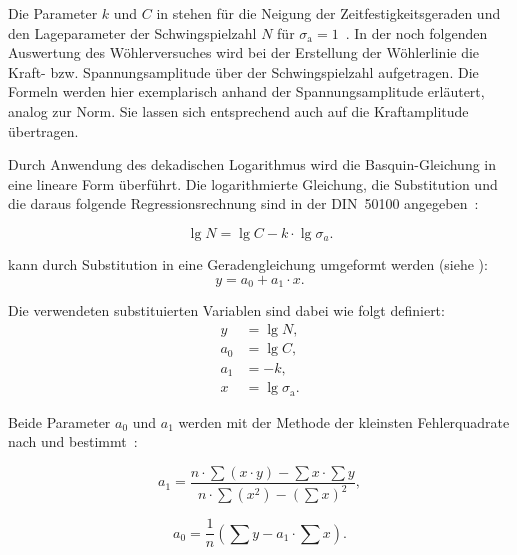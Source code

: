Die Parameter $k$ und $C$ in  stehen für die Neigung der Zeitfestigkeitsgeraden und den Lageparameter der Schwingspielzahl $N$ für $\sigma_{\text{a}} = 1$~\cite[Seite~15]{DIN50100}. 
In der noch folgenden Auswertung des Wöhlerversuches wird bei der Erstellung der Wöhlerlinie die Kraft- bzw. Spannungsamplitude über der Schwingspielzahl aufgetragen. Die Formeln werden hier exemplarisch anhand der Spannungsamplitude erläutert, analog zur Norm. Sie lassen sich entsprechend auch auf die Kraftamplitude übertragen.

Durch Anwendung des dekadischen Logarithmus wird die Basquin-Gleichung in eine lineare Form überführt. Die logarithmierte Gleichung, die Substitution und die daraus folgende Regressionsrechnung sind in der DIN~50100 angegeben~\cite[Seite~55--56]{DIN50100}:

    \begin{equation}\label{eq:Zeitfestigkeitsgerade_log}
    \lg N = \lg C - k \cdot \lg \sigma_a.
    \end{equation}
    
    \clearpage
    
 kann durch Substitution in eine Geradengleichung umgeformt werden (siehe ):
	\begin{equation}
	y = a_0 + a_1 \cdot x.
	\label{eq:substitution}
	\end{equation}
	
Die verwendeten substituierten Variablen sind dabei wie folgt definiert:
\begin{align*}
y   &= \lg N,   \\
a_0 &= \lg C,   \\
a_1 &= -k,  \\           
x   &= \lg \sigma_{\text{a}}.
\end{align*} 

Beide Parameter $a_0$ und $a_1$ werden mit der Methode der kleinsten Fehlerquadrate nach  und  bestimmt~\cite[Seite~55--56]{DIN50100}: 

\begin{equation}\label{eq:reg_a1}
    a_1 = \frac{n \cdot \sum(x \cdot y) - \sum x \cdot \sum y}{n \cdot \sum(x^2) - (\sum x)^2},
\end{equation}

\begin{equation}\label{eq:reg_a0}
    a_0 = \frac{1}{n} \left( \sum y - a_1 \cdot \sum x \right).
\end{equation}

